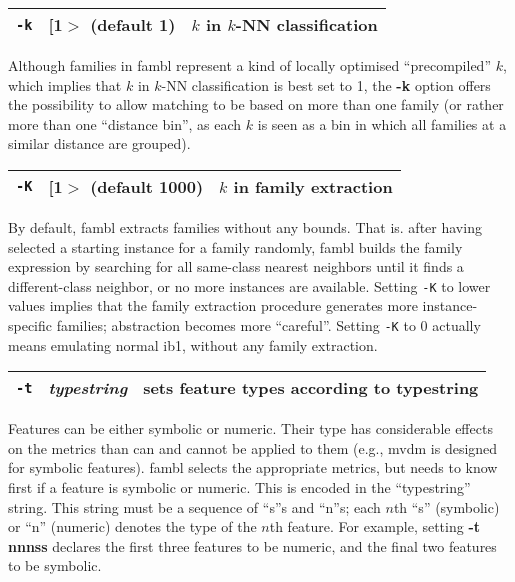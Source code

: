 \documentclass[11pt]{article}
\begin{document}
\begin{tabular}{|p{}|p{}|p{}|}
\hline
{\tt -k} & [1$>$ (default 1) & $k$ in $k$-NN classification \\
\hline
\end{tabular}

Although families in {\sc fambl} represent a kind of locally optimised
``precompiled'' $k$, which implies that $k$ in $k$-NN classification
is best set to 1, the {\bf -k} option offers the possibility to allow
matching to be based on more than one family (or rather more than one
``distance bin'', as each $k$ is seen as a bin in which all families
at a similar distance are grouped). 
\ \\

\begin{tabular}{|p{}|p{}|p{}|}
\hline
{\tt -K} & [1$>$ (default 1000) & $k$ in family extraction \\
\hline
\end{tabular}

By default, {\sc fambl} extracts families without any bounds. That
is. after having selected a starting instance for a family randomly,
{\sc fambl} builds the family expression by searching for all
same-class nearest neighbors until it finds a different-class
neighbor, or no more instances are available. Setting {\tt -K} to
lower values implies that the family extraction procedure generates
more instance-specific families; abstraction becomes more
``careful''. Setting {\tt -K} to 0 actually means emulating normal
{\sc ib1}, without any family extraction.  \ \\

\begin{tabular}{|p{}|p{}|p{}|}
\hline
{\tt -t} & {\sl typestring} & sets feature types according to typestring \\
\hline
\end{tabular}

Features can be either symbolic or numeric. Their type has
considerable effects on the metrics than can and cannot be applied to
them (e.g., {\sc mvdm} is designed for symbolic features). {\sc fambl}
selects the appropriate metrics, but needs to know first if a feature
is symbolic or numeric. This is encoded in the ``typestring''
string. This string must be a sequence of ``s''s and ``n''s; each
$n$th ``s'' (symbolic) or ``n'' (numeric) denotes the type of the
$n$th feature. For example, setting {\bf -t nnnss} declares the first
three features to be numeric, and the final two features to be
symbolic. 
\ \\
\end{document}
